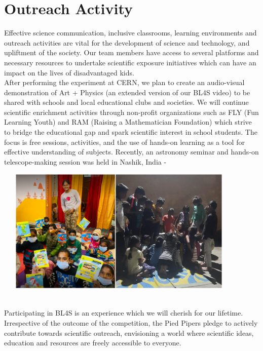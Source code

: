 \section{\textbf{Outreach Activity}}
Effective science communication, inclusive classrooms, learning environments and outreach activities are vital for the development of science and technology, and upliftment of the society. Our team members have access to several platforms and necessary resources to undertake scientific exposure initiatives which can have an impact on the lives of disadvantaged kids. 
\\

After performing the experiment at CERN, we plan to create an audio-visual demonstration of Art + Physics (an extended version of our BL4S video) to be shared with schools and local educational clubs and societies. We will continue scientific enrichment activities through non-profit organizations such as FLY (Fun Learning Youth) and RAM (Raising a Mathematician Foundation) which strive to bridge the educational gap and spark scientific interest in school students. The focus is free sessions, activities, and the use of hands-on learning as a tool for effective understanding of subjects. Recently, an astronomy seminar and hands-on telescope-making session was held in Nashik, India - 

\begin{center}
\includegraphics[width=12cm, height=6cm]{Sections/Diagrams/image.png}
\end{center}
\\

Participating in BL4S is an experience which we will cherish for our lifetime. Irrespective of the outcome of the competition, the Pied Pipers pledge to actively contribute towards scientific outreach, envisioning a world where scientific ideas, education and resources are freely accessible to everyone.